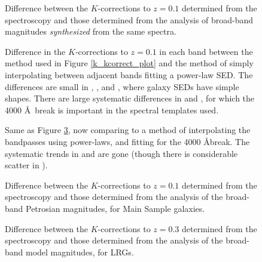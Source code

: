 \clearpage
{}
\begin{figure}
\figurenum{\fignum}
\caption{\label{k_speck_plot.fitfib.0.1} Difference between the
$K$-corrections to $z=0.1$ determined from the spectroscopy and those
determined from the analysis of broad-band magnitudes {\it
synthesized} from the same spectra.}
\end{figure}

\clearpage
{}
\begin{figure}
\figurenum{\fignum}
\caption{\label{compareci} Difference in the $K$-corrections to
$z=0.1$ in each band between the method used in Figure
\ref{k_kcorrect_plot} and the method of simply interpolating between
adjacent bands fitting a power-law SED. The differences are small in
, , and , where galaxy SEDs
have simple shapes. There are large systematic differences in
 and , for which the 4000 \AA\ break is
important in the spectral templates used. }
\end{figure}

\clearpage
{}
\begin{figure}
\figurenum{\fignum}
\caption{\label{comparecibreak} Same as Figure \ref{comparecibreak},
now comparing to a method of interpolating the bandpasses using
power-laws, and fitting for the 4000 \AA break. The systematic trends
in  and  are gone (though there is
considerable scatter in ). }
\end{figure}

\clearpage
{}
\begin{figure}
\figurenum{\fignum}
\caption{\label{k_speck_plot.0.1} Difference between the
$K$-corrections to $z=0.1$ determined from the spectroscopy and those
determined from the analysis of the broad-band Petrosian magnitudes, for
Main Sample galaxies.}
\end{figure}

\clearpage
{}
\begin{figure}
\figurenum{\fignum}
\caption{\label{k_speck_plot.0.3} Difference between the
$K$-corrections to $z=0.3$ determined from the spectroscopy and those
determined from the analysis of the broad-band model magnitudes, for
LRGs.}
\end{figure}
